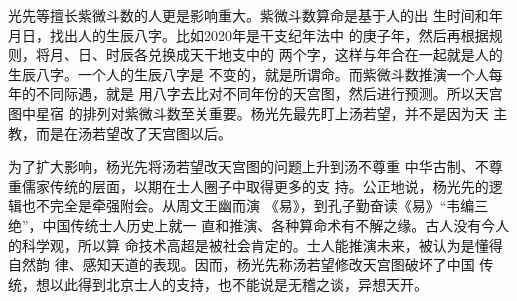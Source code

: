 光先等擅长紫微斗数的人更是影响重大。紫微斗数算命是基于人的出%
生时间和年月日，找出人的生辰八字。比如2020年是干支纪年法中%
的庚子年，然后再根据规则，将月、日、时辰各兑换成天干地支中的%
两个字，这样与年合在一起就是人的生辰八字。一个人的生辰八字是%
不变的，就是所谓命。而紫微斗数推演一个人每年的不同际遇，就是%
用八字去比对不同年份的天宫图，然后进行预测。所以天宫图中星宿%
的排列对紫微斗数至关重要。杨光先最先盯上汤若望，并不是因为天%
主教，而是在汤若望改了天宫图以后。%
\par
为了扩大影响，杨光先将汤若望改天宫图的问题上升到汤不尊重%
中华古制、不尊重儒家传统的层面，以期在士人圈子中取得更多的支%
持。公正地说，杨光先的逻辑也不完全是牵强附会。从周文王幽而演%
《易》，到孔子勤奋读《易》“韦编三绝”，中国传统士人历史上就一%
直和推演、各种算命术有不解之缘。古人没有今人的科学观，所以算%
命技术高超是被社会肯定的。士人能推演未来，被认为是懂得自然韵%
律、感知天道的表现。因而，杨光先称汤若望修改天宫图破坏了中国%
传统，想以此得到北京士人的支持，也不能说是无稽之谈，异想天开。%
